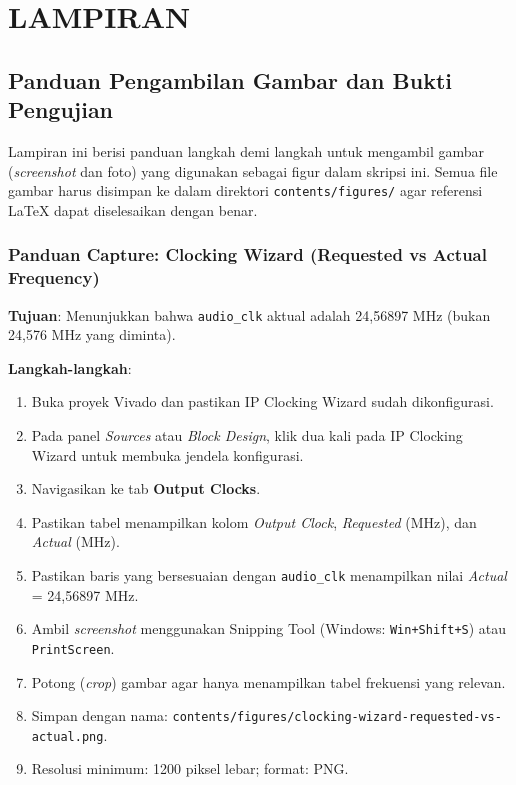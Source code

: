 \chapter*{LAMPIRAN}
\section{Panduan Pengambilan Gambar dan Bukti Pengujian}
\label{app:panduan-capture}

Lampiran ini berisi panduan langkah demi langkah untuk mengambil gambar (\textit{screenshot} dan foto) yang digunakan sebagai figur dalam skripsi ini. Semua file gambar harus disimpan ke dalam direktori \texttt{contents/figures/} agar referensi \LaTeX{} dapat diselesaikan dengan benar.

\subsection{Panduan Capture: Clocking Wizard (Requested vs Actual Frequency)}

\textbf{Tujuan}: Menunjukkan bahwa \texttt{audio\_clk} aktual adalah 24,56897 MHz (bukan 24,576 MHz yang diminta).

\textbf{Langkah-langkah}:
\begin{enumerate}
    \item Buka proyek Vivado dan pastikan IP Clocking Wizard sudah dikonfigurasi.
    \item Pada panel \textit{Sources} atau \textit{Block Design}, klik dua kali pada IP Clocking Wizard untuk membuka jendela konfigurasi.
    \item Navigasikan ke tab \textbf{Output Clocks}.
    \item Pastikan tabel menampilkan kolom \textit{Output Clock}, \textit{Requested} (MHz), dan \textit{Actual} (MHz).
    \item Pastikan baris yang bersesuaian dengan \texttt{audio\_clk} menampilkan nilai \textit{Actual} = 24,56897 MHz.
    \item Ambil \textit{screenshot} menggunakan Snipping Tool (Windows: \texttt{Win+Shift+S}) atau \texttt{PrintScreen}.
    \item Potong (\textit{crop}) gambar agar hanya menampilkan tabel frekuensi yang relevan.
    \item Simpan dengan nama: \texttt{contents/figures/clocking-wizard-requested-vs-actual.png}.
    \item Resolusi minimum: 1200 piksel lebar; format: PNG.
\end{enumerate}


